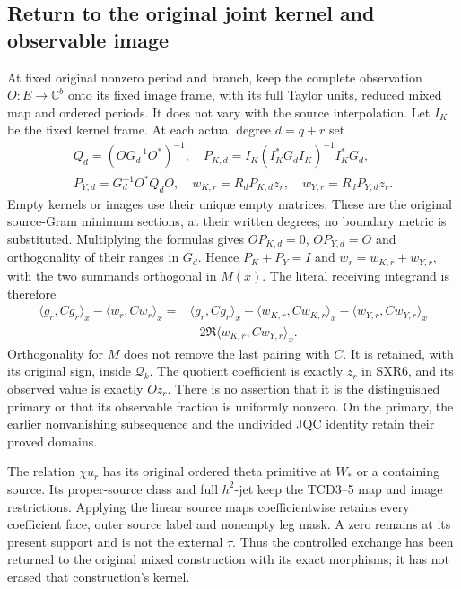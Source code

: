 \subsection{Return to the original joint kernel and observable image}

At fixed original nonzero period and branch, keep the complete
observation $O:E\to\mathbb C^b$ onto its fixed image frame, with
its full Taylor units, reduced mixed map and ordered periods. It
does not vary with the source interpolation. Let $I_K$ be the fixed
kernel frame. At each actual degree $d=q+r$ set
\begin{equation}\tag{SXR19}
\begin{gathered}
 Q_d=(OG_d^{-1}O^*)^{-1},\quad
 P_{K,d}=I_K(I_K^*G_dI_K)^{-1}I_K^*G_d,\\
 P_{Y,d}=G_d^{-1}O^*Q_dO,\quad
 w_{K,r}=R_dP_{K,d}z_r,\quad w_{Y,r}=R_dP_{Y,d}z_r.
\end{gathered}
\end{equation}
Empty kernels or images use their unique empty matrices. These
are the original source-Gram minimum sections, at their written
degrees; no boundary metric is substituted. Multiplying the
formulas gives $OP_{K,d}=0$, $OP_{Y,d}=O$ and orthogonality of
their ranges in $G_d$. Hence $P_K+P_Y=I$ and
$w_r=w_{K,r}+w_{Y,r}$, with the two summands orthogonal in $M(x)$.
The literal receiving integrand is therefore
\begin{equation}\tag{SXR20}
\begin{aligned}
 \langle g_r,Cg_r\rangle_x-\langle w_r,Cw_r\rangle_x
 ={}&\langle g_r,Cg_r\rangle_x
   -\langle w_{K,r},Cw_{K,r}\rangle_x
   -\langle w_{Y,r},Cw_{Y,r}\rangle_x\\
 &-2\Re\langle w_{K,r},Cw_{Y,r}\rangle_x.
\end{aligned}
\end{equation}
Orthogonality for $M$ does not remove the last pairing with $C$.
It is retained, with its original sign, inside $\mathcal Q_k$.
The quotient coefficient is exactly $z_r$ in SXR6, and its observed
value is exactly $Oz_r$. There is no assertion that it is the
distinguished primary or that its observable fraction is uniformly
nonzero. On the primary, the earlier nonvanishing subsequence and
the undivided JQC identity retain their proved domains.

The relation $\chi u_r$ has its original ordered theta primitive
at $W_*$ or a containing source. Its proper-source class and full
$h^2$-jet keep the TCD3--5 map and image restrictions. Applying the
linear source maps coefficientwise retains every coefficient face,
outer source label and nonempty leg mask. A zero remains at its
present support and is not the external $\tau$. Thus the controlled
exchange has been returned to the original mixed construction with
its exact morphisms; it has not erased that construction's kernel.

